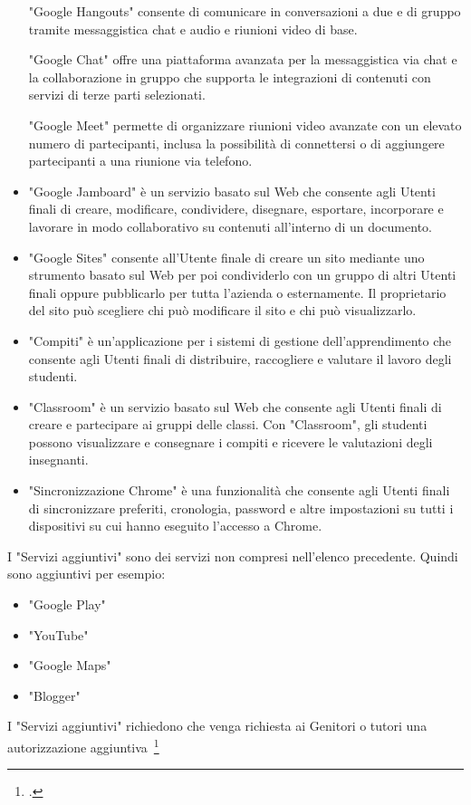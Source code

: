 \begin{itemize}
	\textenglish{"Google Hangouts"} consente di comunicare in conversazioni a due e di gruppo tramite messaggistica chat e audio e riunioni video di base. 
	
	\textenglish{"Google Chat"} offre una piattaforma avanzata per la messaggistica via chat e la collaborazione in gruppo che supporta le integrazioni di contenuti con servizi di terze parti selezionati. 
	
	\textenglish{"Google Meet"} permette di organizzare riunioni video avanzate con un elevato numero di partecipanti, inclusa la possibilità di connettersi o di aggiungere partecipanti a una riunione via telefono.
	\item \textenglish{"Google Jamboard"} è un servizio basato sul Web che consente agli Utenti finali di creare, modificare, condividere, disegnare, esportare, incorporare e lavorare in modo collaborativo su contenuti all'interno di un documento.
	\item \textenglish{"Google Sites"} consente all'Utente finale di creare un sito mediante uno strumento basato sul Web per poi condividerlo con un gruppo di altri Utenti finali oppure pubblicarlo per tutta l'azienda o esternamente. Il proprietario del sito può scegliere chi può modificare il sito e chi può visualizzarlo.
	\item "Compiti" è un'applicazione per i sistemi di gestione dell'apprendimento che consente agli Utenti finali di distribuire, raccogliere e valutare il lavoro degli studenti.
	\item \textenglish{"Classroom"} è un servizio basato sul Web che consente agli Utenti finali di creare e partecipare ai gruppi delle classi. Con \textenglish{"Classroom"}, gli studenti possono visualizzare e consegnare i compiti e ricevere le valutazioni degli insegnanti.
	\item "Sincronizzazione  \textenglish{Chrome}" è una funzionalità che consente agli Utenti finali di sincronizzare preferiti, cronologia, password e altre impostazioni su tutti i dispositivi su cui hanno eseguito l'accesso a \textenglish{Chrome}.
\end{itemize}
I "Servizi aggiuntivi" sono dei servizi non compresi nell'elenco precedente. Quindi sono aggiuntivi per esempio:
\begin{itemize}
	\item \textenglish{"Google Play"}
	\item \textenglish{"YouTube"}
	\item \textenglish{"Google Maps"}
	\item \textenglish{"Blogger"}
\end{itemize}
I "Servizi aggiuntivi" richiedono che venga richiesta ai Genitori o tutori una autorizzazione aggiuntiva~\footcite{Google2022e} 
